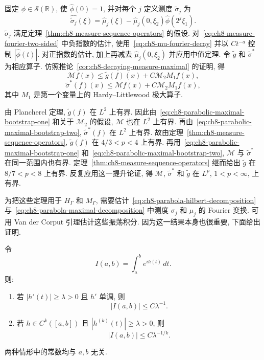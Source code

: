 \begin{Proof}
固定 $\phi\in\mathcal S(\mathbb R)$, 使 $\widehat\phi(0)=1$, 并对每个 $j$ 定义测度 $\widetilde\sigma_j$ 为
\[
 \widehat{\widetilde\sigma_j}(\xi)
 =\widehat\mu_j(\xi)-\widehat\mu_j(0,\xi_2)\widehat\phi(2^j\xi_1).
\]
$\widetilde\sigma_j$ 满足定理~\ref{thm:ch8-measure-sequence-operators} 的假设. 对~\eqref{eq:ch8-measure-fourier-two-sided} 中负指数的估计, 使用~\eqref{eq:ch8-mu-fourier-decay} 并以 $Ct^{-a}$ 控制 $|\widehat\phi(t)|$. 对正指数的估计, 加上再减去 $\widehat\mu_j(0,\xi_2)$ 并应用中值定理. 令 $\widetilde g$ 和 $\widetilde\sigma^*$ 为相应算子. 仿照推论~\ref{cor:ch8-decaying-measure-maximal} 的证明, 得
\begin{equation}
 \mathcal Mf(x)\le\widetilde g(f)(x)+C\mathcal M_2M_1f(x),
 \label{eq:ch8-parabolic-maximal-bootstrap-one}
\end{equation}
\begin{equation}
 \widetilde\sigma^*(f)(x)\le\mathcal Mf(x)+C\mathcal M_2M_1f(x),
 \label{eq:ch8-parabolic-maximal-bootstrap-two}
\end{equation}
其中 $M_1$ 是第一个变量上的 Hardy--Littlewood 极大算子.

由 Plancherel 定理, $\widetilde g(f)$ 在 $L^2$ 上有界. 因此由~\eqref{eq:ch8-parabolic-maximal-bootstrap-one} 和关于 $\mathcal M_2$ 的假设, $\mathcal M$ 也在 $L^2$ 上有界. 再由~\eqref{eq:ch8-parabolic-maximal-bootstrap-two}, $\widetilde\sigma^*(f)$ 在 $L^2$ 上有界. 故由定理~\ref{thm:ch8-measure-sequence-operators}, $\widetilde g(f)$ 在 $4/3<p<4$ 上有界. 再用~\eqref{eq:ch8-parabolic-maximal-bootstrap-one} 和~\eqref{eq:ch8-parabolic-maximal-bootstrap-two}, $\mathcal M$ 与 $\widetilde\sigma^*$ 在同一范围内也有界. 定理~\ref{thm:ch8-measure-sequence-operators} 继而给出 $\widetilde g$ 在 $8/7<p<8$ 上有界. 反复应用这一提升论证, 得 $\mathcal M$, $\widetilde\sigma^*$ 和 $\widetilde g$ 在 $L^p$, $1<p<\infty$, 上有界.
\end{Proof}

为把这些定理用于 $H_\Gamma$ 和 $M_\Gamma$, 需要估计~\eqref{eq:ch8-parabola-hilbert-decomposition} 与~\eqref{eq:ch8-parabola-maximal-decomposition} 中测度 $\sigma_j$ 和 $\mu_j$ 的 Fourier 变换. 可用 Van der Corput 引理估计这些振荡积分. 因为这一结果本身也很重要, 下面给出证明.

\hypertarget{chapter-08-page-195}{}
\begin{Lemma}
\label{lem:ch8-van-der-corput}
令
\[
 I(a,b)=\int_a^be^{ih(t)}\,dt.
\]
则:
\begin{enumerate}[label=(\arabic*)]
\item 若 $|h'(t)|\ge\lambda>0$ 且 $h'$ 单调, 则
\[
 |I(a,b)|\le C\lambda^{-1}.
\]
\item 若 $h\in C^k([a,b])$ 且 $|h^{(k)}(t)|\ge\lambda>0$, 则
\[
 |I(a,b)|\le C\lambda^{-1/k}.
\]
\end{enumerate}
两种情形中的常数均与 $a,b$ 无关.
\end{Lemma}

